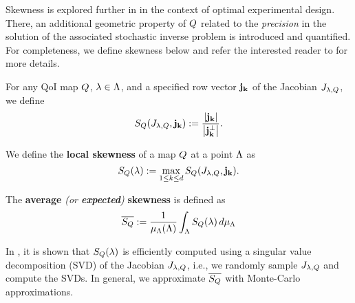 Skewness is explored further in \cite{Walsh} in the context of optimal experimental design.
There, an additional geometric property of $Q$ related to the \emph{precision} in the solution of the associated stochastic inverse problem is introduced and quantified.
For completeness, we define skewness below and refer the interested reader to \cite{BGE+15, BPW17, Walsh} for more details.

\begin{defn}
For any QoI map $Q$, $\lambda \in {\Lambda}$, and a specified row vector $\bf{j}_k$ of the Jacobian $J_{\lambda, Q}$, we define
\begin{equation}
S_Q(J_{\lambda,Q}, \bf{j}_k) := \frac{\left\vert\bf{j}_k\right\vert }{\left\vert\bf{j}_k^\perp\right\vert}.
\label{eq:skewness}
\end{equation}

We define the \textbf{local skewness} of a map $Q$ at a point ${\Lambda}$ as
\begin{equation}
S_Q(\lambda) := \max_{1\leq k \leq d} S_Q(J_{\lambda,Q}, \bf{j}_k).
\label{eq:localskewness}
\end{equation}
\end{defn}

\begin{defn}
The \textbf{average} \emph{(or \textbf{expected})} \textbf{skewness} is defined as
\begin{equation}
\overline{S_Q} := \frac{1}{\mu_{{\Lambda}}({\Lambda})} \int_{\Lambda} S_Q (\lambda) \, d\mu_{{\Lambda}}
\label{eq:avgskew}
\end{equation}
\end{defn}

In \cite{BPW17}, it is shown that $S_Q(\lambda)$ is efficiently computed using a singular value decomposition (SVD) of the Jacobian $J_{\lambda,Q}$, i.e., we randomly sample $J_{\lambda,Q}$ and compute the SVDs.
In general, we approximate $\overline{S_Q}$ with Monte-Carlo approximations.



